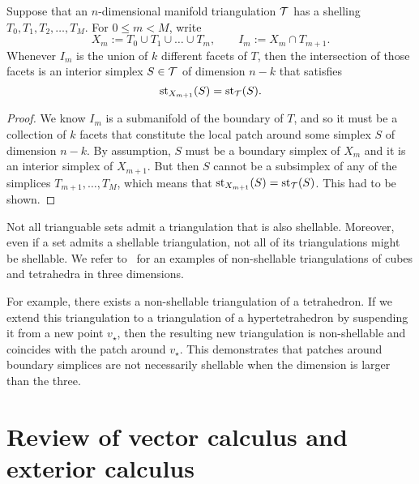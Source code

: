 \documentclass[10pt,letterpaper]{article}
\begin{document}
\begin{lemma}\label{lemma:existenceofstar}
    Suppose that an $n$-dimensional manifold triangulation ${\mathcal T}$ has a shelling $T_{0}, T_{1}, T_{2}, \dots, T_{M}$.
    For $0 \leq m < M$, write 
    $$
        X_{m} := T_{0} \cup T_{1} \cup \dots \cup T_{m},
        \qquad 
        I_{m} := X_{m} \cap T_{m+1}.
    $$ 
    Whenever $I_{m}$ is the union of $k$ different facets of $T$, 
    then the intersection of those facets is an interior simplex $S \in {\mathcal T}$ of dimension $n-k$ that satisfies 
    $$
        \operatorname{st}_{X_{m+1}}(S) = \operatorname{st}_{{\mathcal T}}(S).
    $$
\end{lemma}
\begin{proof}
    We know $I_{m}$ is a submanifold of the boundary of $T$, and so it must be a collection of $k$ facets
    that constitute the local patch around some simplex $S$ of dimension $n-k$.
    By assumption, $S$ must be a boundary simplex of $X_{m}$ and it is an interior simplex of $X_{m+1}$. 
    But then $S$ cannot be a subsimplex of any of the simplices $T_{m+1}, \dots, T_{M}$,
    which means that $\operatorname{st}_{X_{m+1}}(S) = \operatorname{st}_{{\mathcal T}}(S)$. 
    This had to be shown.
\end{proof}




\begin{remark}
    Not all trianguable sets admit a triangulation that is also shellable. 
    Moreover, even if a set admits a shellable triangulation, not all of its triangulations might be shellable. 
    We refer to~\cite[Example 8.9]{ziegler2012lectures} for an examples of non-shellable triangulations of cubes and tetrahedra in three dimensions. 

    For example, there exists a non-shellable triangulation of a tetrahedron. 
    If we extend this triangulation to a triangulation of a hypertetrahedron by suspending it from a new point $v_\star$, 
    then the resulting new triangulation is non-shellable and coincides with the patch around $v_\star$.
    This demonstrates that patches around boundary simplices are not necessarily shellable when the dimension is larger than the three.
\end{remark}


 








\section{Review of vector calculus and exterior calculus}\label{section:calculus}
\end{document}
